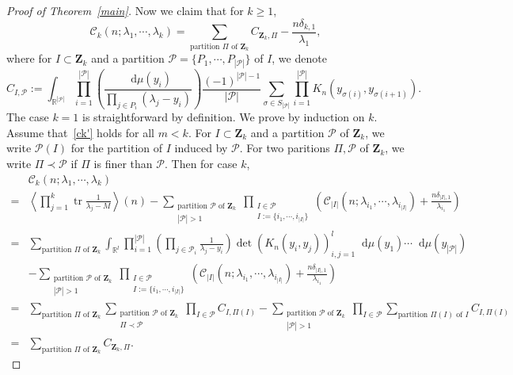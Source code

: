 \documentclass[a4paper]{article}
\theoremstyle{plain}
\theoremstyle{definition}
\newcommand{\dif}{\mathop{}\!\mathrm{d}}
\newcommand{\RR}{\mathbb{R}}
\DeclareMathOperator{\tr}{tr}
\newcommand{\nn}{\nonumber}
\begin{document}
\begin{proof}[Proof of Theorem~\ref{main}]
	Now we claim that for $k\ge1$,
	\begin{equation}
		\mathcal C_{k}(n;\lambda_{1},\cdots,\lambda_{k})=\sum_{\text{partition }\Pi\text{ of }\mathbf Z_k}C_{\mathbf Z_k,\Pi}-\frac{n\delta_{k,1}}{\lambda_1}, \label{ck'}
	\end{equation}
	where for $I\subset\mathbf Z_k$ and a partition $\mathcal P=\{P_1,\cdots,P_{|\mathcal P|}\}$ of $I$, we denote
	\begin{equation}
		C_{I,\mathcal P}:=\int_{\RR^{|\mathcal P|}}\prod_{i=1}^{|\mathcal P|}\left(\frac{\dif\mu(y_i)}{\prod_{j\in P_i}(\lambda_j-y_i)}\right)\frac{(-1)^{|\mathcal P|-1}}{|\mathcal P|}\sum_{\sigma\in S_{|\mathcal P|}}\prod_{i=1}^{|\mathcal P|}K_{n}(y_{\sigma(i)},y_{\sigma(i+1)}).
	\end{equation}
	The case $k=1$ is straightforward by definition. We prove by induction on $k$. Assume that~\eqref{ck'} holds for all $m<k$. 
	For $I\subset\mathbf Z_k$ and a partition $\mathcal P$ of $\mathbf Z_k$, we write $\mathcal P(I)$ for the partition of $I$ induced by $\mathcal P$. For two paritions $\Pi,\mathcal P$ of $\mathbf Z_k$, we write $\Pi\prec\mathcal P$ if $\Pi$ is finer than $\mathcal P$. 
	Then for case $k$,
	\begin{align}
		&\mathcal C_{k}(n;\lambda_{1},\cdots,\lambda_{k})\nn\\
		=&\left\langle\prod_{j=1}^k\tr\frac{1}{\lambda_j-M}\right\rangle(n)-\sum_{\substack{\text{partition }\mathcal{P}\text{ of }\mathbf Z_k\\|\mathcal{P}|>1}}\prod_{\substack{I\in\mathcal{P}\\I:=\{i_1,\cdots,i_{|I|}\}}}\left(\mathcal C_{|I|}(n;\lambda_{i_1},\cdots,\lambda_{i_{|I|}})+\frac{n\delta_{|I|,1}}{\lambda_{i_1}}\right) \nn \\
		=&\sum_{\text{partition }\Pi\text{ of }\mathbf Z_k}\int_{\RR^l}\prod_{i=1}^{|\mathcal P|}\left(\prod_{j \in \mathcal P_i} \frac{1}{\lambda_{j}-y_{i}}\right)\det(K_{n}(y_{i},y_{j}))_{i,j=1}^{l} \dif\mu(y_{1})\cdots\dif\mu(y_{|\mathcal P|})\nn\\
		&-\sum_{\substack{\text{partition }\mathcal{P}\text{ of }\mathbf Z_k\\|\mathcal{P}|>1}}\prod_{\substack{I\in\mathcal{P}\\I:=\{i_1,\cdots,i_{|I|}\}}}\left(\mathcal C_{|I|}(n;\lambda_{i_1},\cdots,\lambda_{i_{|I|}})+\frac{n\delta_{|I|,1}}{\lambda_{i_1}}\right)\nn \\
		=&\sum_{\text{partition }\Pi\text{ of }\mathbf Z_k}\sum_{\substack{\text{partition }\mathcal P\text{ of }\mathbf Z_k \\ \Pi\prec\mathcal P}}\prod_{I\in\mathcal P}C_{I,\Pi(I)}-\sum_{\substack{\text{partition }\mathcal P\text{ of }\mathbf Z_k \\ |\mathcal P|>1}}\prod_{I\in\mathcal P}\sum_{\text{partition }\Pi(I)\text{ of }I}C_{I,\Pi(I)} \nn\\
		=&\sum_{\text{partition }\Pi\text{ of }\mathbf Z_k}C_{\mathbf Z_k,\Pi}. \label{n>k}
	\end{align}


\end{proof}
\end{document}
